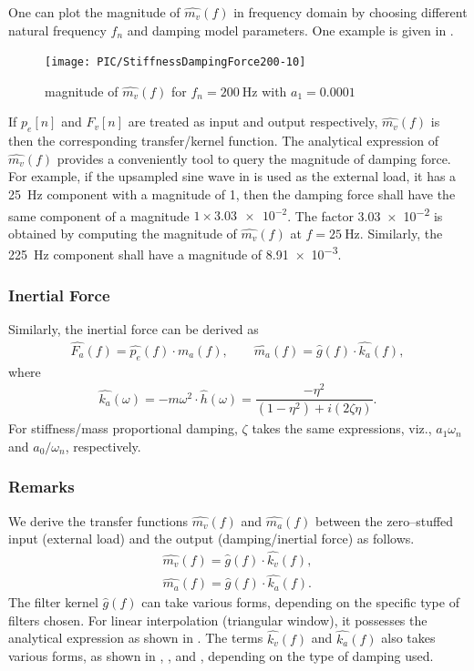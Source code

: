 One can plot the magnitude of $\hat{m_v}\left(f\right)$ in frequency domain by choosing different natural frequency $f_n$ and damping model parameters. One example is given in .
\begin{figure}[htb!]
\centering
\texttt{[image: PIC/StiffnessDampingForce200-10]}
\caption{magnitude of $\hat{m_v}\left(f\right)$ for $f_n=\SI{200}{\hertz}$ with $a_1=0.0001$}\label{fig:k_proportional_damping}
\end{figure}
If $p_e[n]$ and $F_v[n]$ are treated as input and output respectively, $\hat{m_v}\left(f\right)$ is then the corresponding transfer/kernel function.
The analytical expression of $\hat{m_v}\left(f\right)$ provides a conveniently tool to query the magnitude of damping force. For example, if the upsampled sine wave in  is used as the external load, it has a \SI{25}{\hertz} component with a magnitude of \num{1}, then the damping force shall have the same component of a magnitude $1\times\num{3.03e-2}$. The factor \num{3.03e-2} is obtained by computing the magnitude of $\hat{m_v}\left(f\right)$ at $f=\SI{25}{\hertz}$. Similarly, the \SI{225}{\hertz} component shall have a magnitude of \num{8.91e-3}.
\subsubsection{Inertial Force}
Similarly, the inertial force can be derived as
\begin{gather}
\hat{F_a}\left(f\right)=\hat{p_e}\left(f\right)\cdot\hat{m_a}\left(f\right),\qquad
\hat{m_a}\left(f\right)=\hat{g}\left(f\right)\cdot\hat{k_a}\left(f\right),
\end{gather}
where
\begin{gather}\label{eq:inertial_force}
\hat{k_a}\left(\omega\right)=-m\omega^2\cdot\hat{h}\left(\omega\right)=\dfrac{-\eta^2}{\left(1-\eta^2\right)+i\left(2\zeta\eta\right)}.
\end{gather}
For stiffness/mass proportional damping, $\zeta$ takes the same expressions, viz., $a_1\omega_n$ and $a_0/\omega_n$, respectively.
\subsubsection{Remarks}
We derive the transfer functions $\hat{m_v}\left(f\right)$ and $\hat{m_a}\left(f\right)$ between the zero--stuffed input (external load) and the output (damping/inertial force) as follows.
\begin{gather}
\hat{m_v}\left(f\right)=\hat{g}\left(f\right)\cdot\hat{k_v}\left(f\right),\\
\hat{m_a}\left(f\right)=\hat{g}\left(f\right)\cdot\hat{k_a}\left(f\right).
\end{gather}
The filter kernel $\hat{g}\left(f\right)$ can take various forms, depending on the specific type of filters chosen. For linear interpolation (triangular window), it possesses the analytical expression as shown in . The terms $\hat{k_v}\left(f\right)$ and $\hat{k_a}\left(f\right)$ also takes various forms, as shown in , ,  and , depending on the type of damping used.

